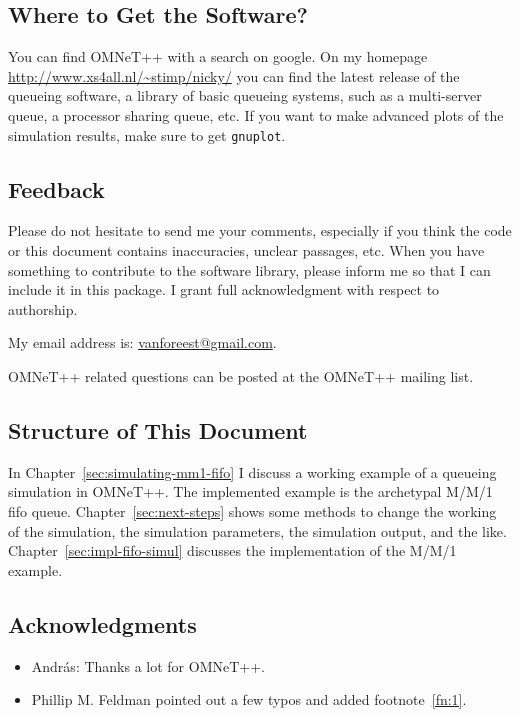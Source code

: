 \documentclass[a4paper]{article}
\begin{document}
\subsection{Where to Get the Software?}
\label{sec:where-get-software}
You can find OMNeT++ with a search on google.  On my homepage
\url{http://www.xs4all.nl/~stimp/nicky/} you can find the latest
release of the queueing software, a library of basic queueing systems,
such as a multi-server queue, a processor sharing queue, etc.  If you
want to make advanced plots of the simulation results, make sure to
get \texttt{gnuplot}.

\subsection{Feedback}
\label{sec:feedback}
Please do not hesitate to send me your comments, especially if you
think the code or this document contains inaccuracies, unclear
passages, etc. When you have something to contribute to the software
library, please inform me so that I can include it in this package. I
grant full acknowledgment with respect to authorship.

My email address is: \url{vanforeest@gmail.com}.

OMNeT++ related questions can be posted at the OMNeT++ mailing list.

\subsection{Structure of This Document}
\label{sec:struct-this-docum}
In Chapter~\ref{sec:simulating-mm1-fifo} I discuss a working example
of a queueing simulation in OMNeT++.  The implemented example is the
archetypal M/M/1 fifo queue.  Chapter~\ref{sec:next-steps} shows some
methods to change the working of the simulation, the simulation
parameters, the simulation output, and the like.
Chapter~\ref{sec:impl-fifo-simul} discusses the
implementation of the M/M/1 example.  

\subsection{Acknowledgments}
\label{sec:acknowledgements}
\begin{itemize}
\item Andr{\'a}s: Thanks a lot for OMNeT++. 
\item Phillip M. Feldman pointed out a few typos and added footnote~\ref{fn:1}.

\end{itemize}
\end{document}
